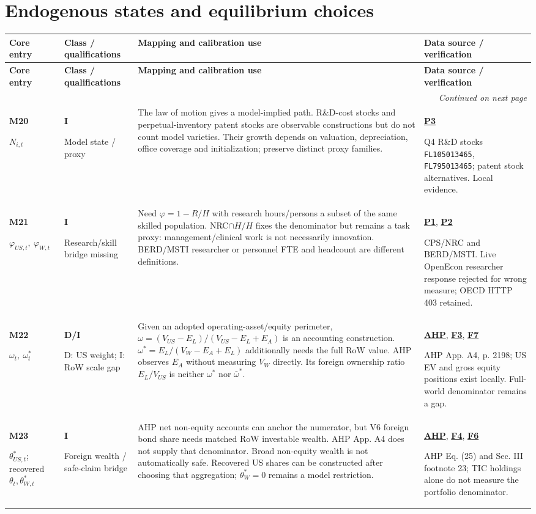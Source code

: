 \documentclass[10pt,a4paper,landscape]{article}
\makeatletter
\newcommand{\code}[1]{{\footnotesize\texttt{#1}}}
\newenvironment{measuretable}{%
\fontsize{9.4}{10.8}\selectfont\setlength{\parskip}{1pt}
\begin{longtable}{@{}P{\dimexpr .14\textwidth-4.2pt\relax}P{\dimexpr .135\textwidth-4.05pt\relax}P{\dimexpr .455\textwidth-13.65pt\relax}P{\dimexpr .27\textwidth-8.1pt\relax}@{}}
\toprule\rowcolor{tablehead}\textbf{Core entry} & \textbf{Class / qualifications} & \textbf{Mapping and calibration use} & \textbf{Data source / verification}\\\midrule
\endfirsthead
\toprule\rowcolor{tablehead}\textbf{Core entry} & \textbf{Class / qualifications} & \textbf{Mapping and calibration use} & \textbf{Data source / verification}\\\midrule
\endhead\midrule\multicolumn{4}{r}{\footnotesize\itshape Continued on next page}\\\endfoot
\bottomrule\endlastfoot
}{\end{longtable}}
\makeatother
\begin{document}
\section{Endogenous states and equilibrium choices}

\begin{measuretable}
\textbf{M20}\par $N_{i,t}$ & \textbf{I}\par Model state / proxy & The law of motion gives a model-implied path. R\&D-cost stocks and perpetual-inventory patent stocks are observable constructions but do not count model varieties. Their growth depends on valuation, depreciation, office coverage and initialization; preserve distinct proxy families. & \hyperlink{src-P3}{\textbf{P3}}\par Q4 R\&D stocks \code{FL105013465}, \code{FL795013465}; patent stock alternatives. Local evidence.\\[4pt]
\textbf{M21}\par $\varphi_{US,t},\ \varphi_{W,t}$ & \textbf{I}\par Research/skill bridge missing & Need $\varphi=1-R/H$ with research hours/persons a subset of the same skilled population. NRC$\cap H/H$ fixes the denominator but remains a task proxy: management/clinical work is not necessarily innovation. BERD/MSTI researcher or personnel FTE and headcount are different definitions. & \hyperlink{src-P1}{\textbf{P1}}, \hyperlink{src-P2}{\textbf{P2}}\par CPS/NRC and BERD/MSTI. Live OpenEcon researcher response rejected for wrong measure; OECD HTTP 403 retained.\\[4pt]
\textbf{M22}\par $\omega_t,\ \omega_t^*$ & \textbf{D/I}\par D: US weight; I: RoW scale gap & Given an adopted operating-asset/equity perimeter, $\omega=(V_{US}-E_L)/(V_{US}-E_L+E_A)$ is an accounting construction. $\omega^*=E_L/(V_W-E_A+E_L)$ additionally needs the full RoW value. AHP observes $E_A$ without measuring $V_W$ directly. Its foreign ownership ratio $E_L/V_{US}$ is neither $\omega^*$ nor $\bar\omega^*$. & \hyperlink{src-AHP}{\textbf{AHP}}, \hyperlink{src-F3}{\textbf{F3}}, \hyperlink{src-F7}{\textbf{F7}}\par AHP App. A4, p. 2198; US EV and gross equity positions exist locally. Full-world denominator remains a gap.\\[4pt]
\textbf{M23}\par $\theta_{US,t}^*$; recovered $\theta_t,\theta_{W,t}^*$ & \textbf{I}\par Foreign wealth / safe-claim bridge & AHP net non-equity accounts can anchor the numerator, but V6 foreign bond share needs matched RoW investable wealth. AHP App. A4 does not supply that denominator. Broad non-equity wealth is not automatically safe. Recovered US shares can be constructed after choosing that aggregation; $\theta_W^*=0$ remains a model restriction. & \hyperlink{src-AHP}{\textbf{AHP}}, \hyperlink{src-F4}{\textbf{F4}}, \hyperlink{src-F6}{\textbf{F6}}\par AHP Eq. (25) and Sec. III footnote 23; TIC holdings alone do not measure the portfolio denominator.\\[4pt]

\end{measuretable}
\end{document}
